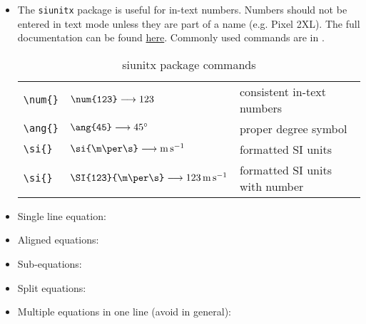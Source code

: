 \begin{itemize}
\begin{table*}
\begin{tabular}{lll}
            \verb|\partialderivative| & $\verb|\pdv{x}|\ \longrightarrow \pdv{x}$ & \\
            & $\verb|\pdv{y}{x}|\ \longrightarrow \pdv{y}{x}$ & \\
            & $\verb|\pdv[2]{y}{x}|\ \longrightarrow \pdv[2]{y}{x}$ & \\
        \end{tabular}
    \end{table*}
    \begin{itemize}
        \item The standard set of trig functions is redefined in \verb|physics| to provide automatic braces that behave like \verb|\qty()| when used as \verb|\sin(...)|. 
    \end{itemize}
    \item The \verb|siunitx| package is useful for in-text numbers. Numbers should not be entered in text mode unless they are part of a name (e.g. Pixel 2XL). The full documentation can be found \href{https://ctan.org/pkg/siunitx?lang=en}{here}. Commonly used commands are in .
    \begin{table*}
        \centering
        \caption{siunitx package commands}
        \label{tab:SiunitxCommands}
        \begin{tabular}{lll}
            \verb|\num{}| & $\verb|\num{123}| \longrightarrow \num{123}$ & consistent in-text numbers \\
            \verb|\ang{}| & $\verb|\ang{45}| \longrightarrow \ang{45}$ & proper degree symbol \\
            \verb|\si{}| & $\verb|\si{\m\per\s}| \longrightarrow \si{\m\per\s}$ & formatted SI units \\
            \verb|\si{}| & $\verb|\SI{123}{\m\per\s}| \longrightarrow \SI{123}{\m\per\s}$ & formatted SI units with number \\
        \end{tabular}
    \end{table*}
    \item Single line equation: 
    \item Aligned equations: 
    \item Sub-equations: 
    \item Split equations: 
    \item Multiple equations in one line (avoid in general): 
\end{itemize}
% 
